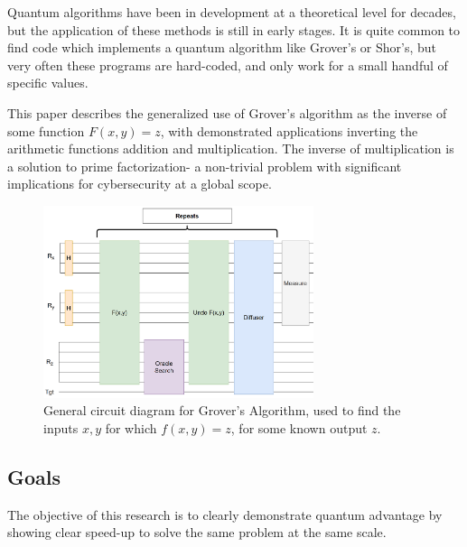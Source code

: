 \documentclass[twocolumn]{cinc}
\begin{document}
Quantum algorithms have been in development at a theoretical level for
decades, but the application of these methods is still in early stages.
It is quite common to find code which implements a quantum algorithm like
Grover's\cite{grover} or Shor's\cite{shor}, but very often these 
programs are hard-coded, and only
work for a small handful of specific values\cite{shors_ibm}.

This paper describes the generalized use of Grover's algorithm as the
inverse of some function $F(x, y) = z$, with demonstrated applications
inverting the arithmetic functions addition and multiplication. The 
inverse of multiplication is a solution to prime factorization- a 
non-trivial problem with significant implications for cybersecurity
at a global scope.

\begin{figure}[ht]\label{fig:FIGURA1}
\centering
\includegraphics[width=7.9cm]{grover_inversion.png}
\caption{General circuit diagram for Grover's Algorithm, used to find 
the inputs $x, y$ for which $f(x,y)=z$, for some known output $z$.}
\end{figure}

  \subsection{Goals}

  The objective of this research is to clearly demonstrate quantum advantage 
  by showing clear speed-up to solve the same problem at the same scale.

  
\end{document}
